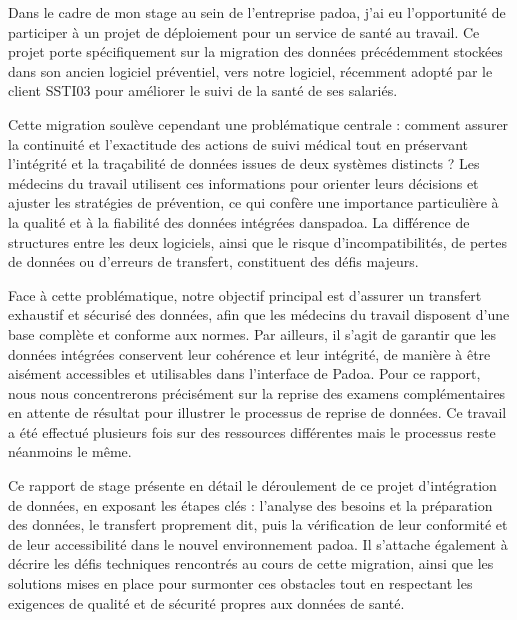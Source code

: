 
Dans le cadre de mon stage au sein de l'entreprise padoa, j’ai eu l’opportunité de participer à un projet de déploiement pour un service de santé au travail. Ce projet porte spécifiquement sur la migration des données précédemment stockées dans son ancien logiciel préventiel, vers notre logiciel, récemment adopté par le client SSTI03 pour améliorer le suivi de la santé de ses salariés. 

Cette migration soulève cependant une problématique centrale : comment assurer la continuité et l’exactitude des actions de suivi médical tout en préservant l’intégrité et la traçabilité de données issues de deux systèmes distincts ? Les médecins du travail utilisent ces informations pour orienter leurs décisions et ajuster les stratégies de prévention, ce qui confère une importance particulière à la qualité et à la fiabilité des données intégrées danspadoa. La différence de structures entre les deux logiciels, ainsi que le risque d’incompatibilités, de pertes de données ou d’erreurs de transfert, constituent des défis majeurs. 

Face à cette problématique, notre objectif principal est d’assurer un transfert exhaustif et sécurisé des données, afin que les médecins du travail disposent d’une base complète et conforme aux normes. Par ailleurs, il s’agit de garantir que les données intégrées conservent leur cohérence et leur intégrité, de manière à être aisément accessibles et utilisables dans l’interface de Padoa.
Pour ce rapport, nous nous concentrerons précisément sur la reprise des examens complémentaires en attente de résultat pour illustrer le processus de reprise de données. Ce travail a été effectué plusieurs fois sur des ressources différentes mais le processus reste néanmoins le même. 

Ce rapport de stage présente en détail le déroulement de ce projet d’intégration de données, en exposant les étapes clés : l’analyse des besoins et la préparation des données, le transfert proprement dit, puis la vérification de leur conformité et de leur accessibilité dans le nouvel environnement padoa. Il s’attache également à décrire les défis techniques rencontrés au cours de cette migration, ainsi que les solutions mises en place pour surmonter ces obstacles tout en respectant les exigences de qualité et de sécurité propres aux données de santé.

\smallskip